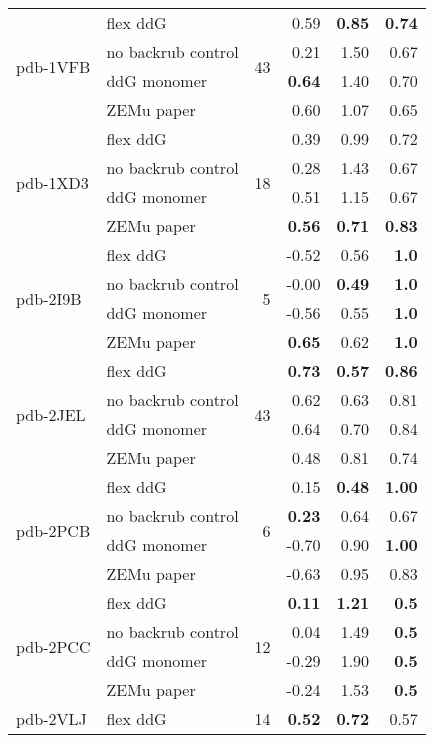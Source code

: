 {\begin{longtable}{llrrrr}
\hline
 \multirow{ 4}{*}{pdb-1VFB} & flex ddG & \multirow{ 4}{*}{43} & 0.59 & \textbf{0.85} & \textbf{0.74}  \\
 & no backrub control & & 0.21 & 1.50 & 0.67  \\
 & ddG monomer & & \textbf{0.64} & 1.40 & 0.70  \\
 & ZEMu paper & & 0.60 & 1.07 & 0.65  \\
\hline
 \multirow{ 4}{*}{pdb-1XD3} & flex ddG & \multirow{ 4}{*}{18} & 0.39 & 0.99 & 0.72  \\
 & no backrub control & & 0.28 & 1.43 & 0.67  \\
 & ddG monomer & & 0.51 & 1.15 & 0.67  \\
 & ZEMu paper & & \textbf{0.56} & \textbf{0.71} & \textbf{0.83}  \\
\hline
 \multirow{ 4}{*}{pdb-2I9B} & flex ddG & \multirow{ 4}{*}{5} & -0.52 & 0.56 & \textbf{1.0}  \\
 & no backrub control & & -0.00 & \textbf{0.49} & \textbf{1.0}  \\
 & ddG monomer & & -0.56 & 0.55 & \textbf{1.0}  \\
 & ZEMu paper & & \textbf{0.65} & 0.62 & \textbf{1.0}  \\
\hline
 \multirow{ 4}{*}{pdb-2JEL} & flex ddG & \multirow{ 4}{*}{43} & \textbf{0.73} & \textbf{0.57} & \textbf{0.86}  \\
 & no backrub control & & 0.62 & 0.63 & 0.81  \\
 & ddG monomer & & 0.64 & 0.70 & 0.84  \\
 & ZEMu paper & & 0.48 & 0.81 & 0.74  \\
\hline
 \multirow{ 4}{*}{pdb-2PCB} & flex ddG & \multirow{ 4}{*}{6} & 0.15 & \textbf{0.48} & \textbf{1.00}  \\
 & no backrub control & & \textbf{0.23} & 0.64 & 0.67  \\
 & ddG monomer & & -0.70 & 0.90 & \textbf{1.00}  \\
 & ZEMu paper & & -0.63 & 0.95 & 0.83  \\
\hline
 \multirow{ 4}{*}{pdb-2PCC} & flex ddG & \multirow{ 4}{*}{12} & \textbf{0.11} & \textbf{1.21} & \textbf{0.5}  \\
 & no backrub control & & 0.04 & 1.49 & \textbf{0.5}  \\
 & ddG monomer & & -0.29 & 1.90 & \textbf{0.5}  \\
 & ZEMu paper & & -0.24 & 1.53 & \textbf{0.5}  \\
\hline
 \multirow{ 4}{*}{pdb-2VLJ} & flex ddG & \multirow{ 4}{*}{14} & \textbf{0.52} & \textbf{0.72} & 0.57  \\

\end{longtable}}

